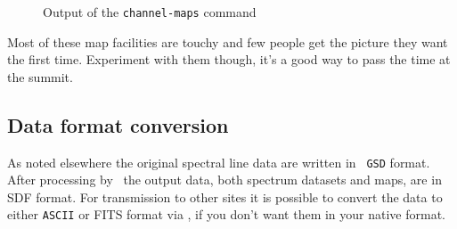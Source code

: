 \begin{figure}[htb]
\centering
\leavevmode
\epsfysize=5in
\vspace*{-0.5cm}
\begin{center}
\begin{minipage}[t]{5in}
\caption[Velocity slices]
{\small{Output of the {\tt channel-maps} command}
}
\label{fig:specx_chann_maps}
\end{minipage}
\end{center}
\end{figure}

Most of these map facilities are touchy and few people get the picture
they want the first time.  Experiment with them though, it's a good
way to pass the time at the summit.

\subsection{Data format conversion}
\label{sec:fits-etc}
As noted elsewhere the original spectral line data are written in {\tt
GSD} format. After processing by \SPECX\ the output data, both
spectrum datasets and maps, are in SDF format. For transmission to
other sites it is possible to convert the data to either {\tt ASCII}
or FITS format via
\SPECX , if you don't want them in your native format.

